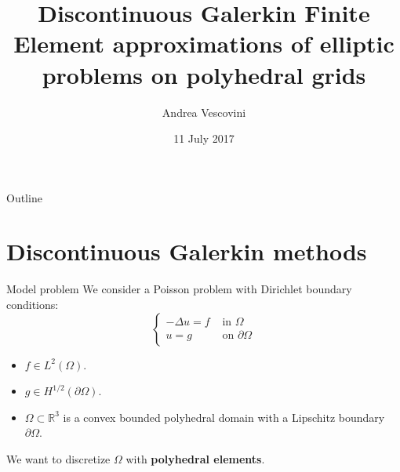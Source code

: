 \documentclass{beamer}
\title
[DG-FE approximations of elliptic problems on polyhedral grids]
{Discontinuous Galerkin Finite Element approximations of elliptic problems on
polyhedral grids}
\author[Andrea Vescovini]{Andrea Vescovini}
\institute{Politecnico di Milano}
\date{11 July 2017}
\begin{document}
\begin{frame}
	\centering
	\maketitle
\end{frame}
\begin{frame}{Outline}
	\tableofcontents
\end{frame}
\section[DG methods]{Discontinuous Galerkin methods}
\begin{frame}{Model problem}
	We consider a Poisson problem with Dirichlet boundary conditions:
	\begin{equation*}\begin{cases}
		-\Delta u= f& \mbox{ in } \Omega\\
		u = g& \mbox{ on } \partial \Omega
	\end{cases}\end{equation*}
	\begin{itemize}
		\item $f \in L^2(\Omega)$.
		\item $g \in H^{1/2}(\partial \Omega)$.
		\item $\Omega \subset \mathbb{R}^3$ is a convex bounded polyhedral 		
				domain with a Lipschitz boundary $\partial \Omega$.
	\end{itemize}
	\vspace*{0.5cm}
	\centering
	We want to discretize $\Omega$ with \textbf{polyhedral elements}.
\end{frame}
\end{document}
